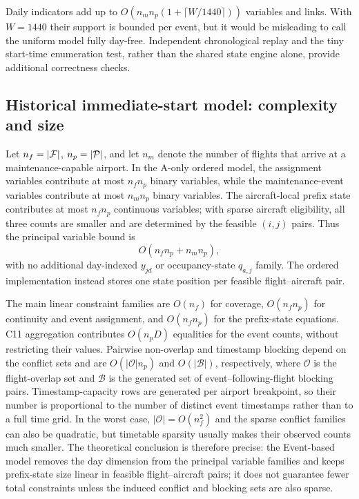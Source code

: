 Daily indicators add up to
$O(n_m n_p(1+\lceil W/1440\rceil))$ variables and links. With $W=1440$
their support is bounded per event, but it would be misleading to call the
uniform model fully day-free. Independent chronological replay and the
tiny start-time enumeration test, rather than the shared state engine alone,
provide additional correctness checks.

\subsection{Historical immediate-start model: complexity and size}

Let $n_f=|\mathcal{F}|$, $n_p=|\mathcal{P}|$, and let $n_m$ denote the number of flights
that arrive at a maintenance-capable airport. In the A-only ordered model,
the assignment variables contribute at most $n_fn_p$ binary variables, while
the maintenance-event variables contribute at most $n_mn_p$ binary variables.
The aircraft-local prefix state contributes at most $n_fn_p$ continuous
variables; with sparse aircraft eligibility, all three counts are smaller and
are determined by the feasible $(i,j)$ pairs. Thus the principal variable
bound is
\[
O(n_fn_p+n_mn_p),
\]
with no additional day-indexed $y_{jd}$ or occupancy-state $q_{a,j}$ family.
The ordered implementation instead stores one state position per feasible
flight--aircraft pair.

The main linear constraint families are $O(n_f)$ for coverage,
$O(n_fn_p)$ for continuity and event assignment, and $O(n_fn_p)$ for the
prefix-state equations. C11 aggregation contributes $O(n_pD)$ equalities for
the event counts, without restricting their values. Pairwise
non-overlap and timestamp blocking depend on the conflict sets and are
$O(|\mathcal{O}|n_p)$ and $O(|\mathcal{B}|)$, respectively, where
$\mathcal{O}$ is the flight-overlap set and $\mathcal{B}$ is the generated set
of event--following-flight blocking pairs. Timestamp-capacity rows are
generated per airport breakpoint, so their number is proportional to the
number of distinct event timestamps rather than to a full time grid. In the
worst case, $|\mathcal{O}|=O(n_f^2)$ and the sparse conflict families can also
be quadratic, but timetable sparsity usually makes their observed counts much
smaller. The theoretical conclusion is therefore precise: the Event-based
model removes the day dimension from the principal variable families and
keeps prefix-state size linear in feasible flight--aircraft pairs; it does not
guarantee fewer total constraints unless the induced conflict and blocking
sets are also sparse.

